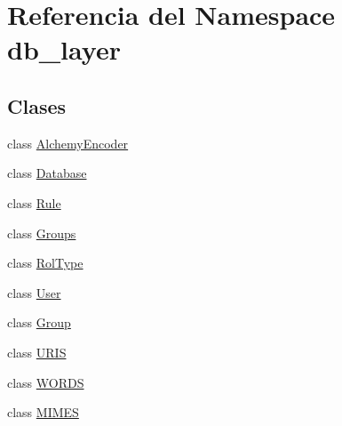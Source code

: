 \hypertarget{namespacedb__layer}{\section{Referencia del Namespace db\-\_\-layer}
\label{namespacedb__layer}
}
\subsection*{Clases}
\begin{DoxyCompactItemize}
\item 
class \hyperlink{classdb__layer_1_1_alchemy_encoder}{Alchemy\-Encoder}
\item 
class \hyperlink{classdb__layer_1_1_database}{Database}
\item 
class \hyperlink{classdb__layer_1_1_rule}{Rule}
\item 
class \hyperlink{classdb__layer_1_1_groups}{Groups}
\item 
class \hyperlink{classdb__layer_1_1_rol_type}{Rol\-Type}
\item 
class \hyperlink{classdb__layer_1_1_user}{User}
\item 
class \hyperlink{classdb__layer_1_1_group}{Group}
\item 
class \hyperlink{classdb__layer_1_1_u_r_i_s}{U\-R\-I\-S}
\item 
class \hyperlink{classdb__layer_1_1_w_o_r_d_s}{W\-O\-R\-D\-S}
\item 
class \hyperlink{classdb__layer_1_1_m_i_m_e_s}{M\-I\-M\-E\-S}
\end{DoxyCompactItemize}
